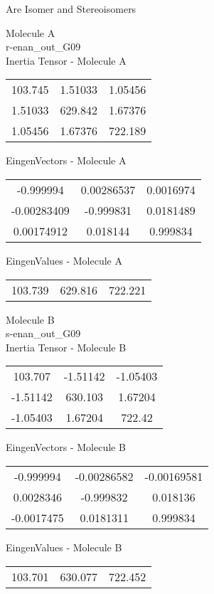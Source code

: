 \begin{center}
\vtab
\vtab
\textcolor{NavyBlue}{\Large Are Isomer and Stereoisomers}
\end{center}
\newpage
\begin{multicols}{2}
\begin{center}
Molecule A \\ 
r-enan\_out\_G09
\\
Inertia Tensor - Molecule A \\
\vtab
\begin{tabular}{|c c c|}
103.745	 & 	1.51033	 & 	1.05456	 \\
1.51033	 & 	629.842	 & 	1.67376	 \\
1.05456	 & 	1.67376	 & 	722.189
\end{tabular}

\vtab
 EingenVectors - Molecule A     \\
\vtab
\begin{tabular}{|c c c|}
-0.999994	 & 	0.00286537	 & 	0.0016974	 \\
-0.00283409	 & 	-0.999831	 & 	0.0181489	 \\
0.00174912	 & 	0.018144	 & 	0.999834
\end{tabular}

\vtab
 EingenValues - Molecule A     \\
\vtab
\begin{tabular}{|c c c|}
103.739	 & 	629.816	 & 	722.221
\end{tabular}
\columnbreak

Molecule B \\ 
s-enan\_out\_G09
\\
Inertia Tensor - Molecule B \\
\vtab
\begin{tabular}{|c c c|}
103.707	 & 	-1.51142	 & 	-1.05403	 \\
-1.51142	 & 	630.103	 & 	1.67204	 \\
-1.05403	 & 	1.67204	 & 	722.42
\end{tabular}

\vtab
 EingenVectors - Molecule B     \\
\vtab
\begin{tabular}{|c c c|}
-0.999994	 & 	-0.00286582	 & 	-0.00169581	 \\
0.0028346	 & 	-0.999832	 & 	0.018136	 \\
-0.0017475	 & 	0.0181311	 & 	0.999834
\end{tabular}

\vtab
 EingenValues - Molecule B     \\
\vtab
\begin{tabular}{|c c c|}
103.701	 & 	630.077	 & 	722.452
\end{tabular}

\end{center}
\end{multicols}
